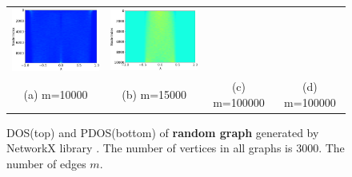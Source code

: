 \documentclass[senior,final,11pt]{iscs-thesis}
\begin{document}
\begin{figure}[htbp]
\begin{tabular}{cccc}
    \includegraphics[width=45mm]{figure/gnm_random_graph_n10000_m20000txt_pdos.png} &
    \includegraphics[width=45mm]{figure/gnm_random_graph_n10000_m100000txt_pdos.png} \\
    (a) m=10000 & (b) m=15000 & (c) m=100000 & (d) m=100000 \\ [6pt]
  \end{tabular}
  \caption{DOS(top) and PDOS(bottom) of {\bf random graph} generated by NetworkX library \cite{SciPyProceedings_11}. The number of vertices in all graphs is 3000. The number of edges $m$.}
  \label{fig:random}
\end{figure}
\end{document}
